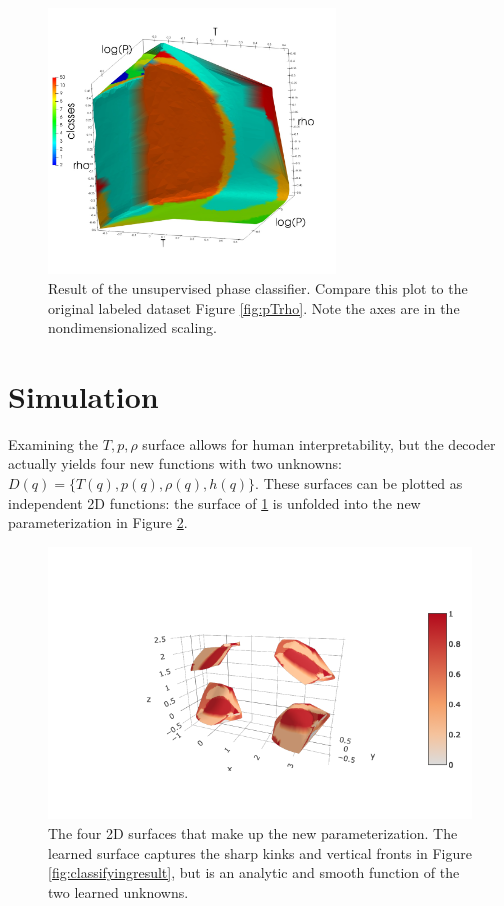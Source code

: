\documentclass[]{article}
\begin{document}
\begin{figure}
  \centering
  \includegraphics[width=3in]{../slides/classifier_good.jpg}
  \caption{\label{fig:classified}Result of the unsupervised phase
    classifier. Compare this plot to the original labeled dataset
    Figure \ref{fig:pTrho}. Note the axes are in the
    nondimensionalized scaling.}
\end{figure}

\hypertarget{header-n3321}{%
\section{Simulation}\label{header-n3321}}

Examining the $T,p,\rho$ surface allows for human interpretability, but
the decoder actually yields four new functions with two unknowns:
$D(q)=\{T(q),p(q),\rho(q),h(q)\}$. These surfaces can be plotted as
independent 2D functions: the surface of \ref{fig:classified} is
unfolded into the new parameterization in Figure \ref{fig:foursurfaces}.
\begin{figure}
  \centering
  \includegraphics{../slides/water_four_surfaces_plot.png}
  \caption{\label{fig:foursurfaces}The four 2D surfaces that make up
    the new parameterization. The learned surface captures the sharp
    kinks and vertical fronts in Figure \ref{fig:classifyingresult},
    but is an analytic and smooth function of the two learned unknowns.}
  \end{figure}
\end{document}
